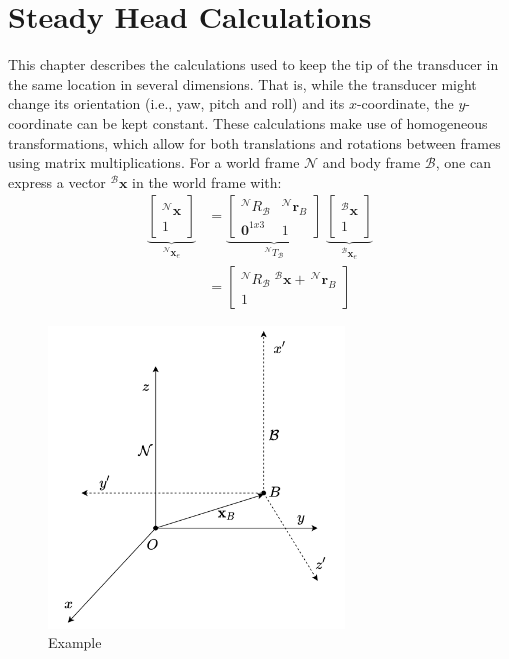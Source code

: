 \chapter{Steady Head Calculations}
\label{chap:SHC}
This chapter describes the calculations used to keep the tip of the transducer in the same location in several dimensions. That is, while the transducer might change its orientation (i.e., yaw, pitch and roll) and its $x$-coordinate, the $y$-coordinate can be kept constant. These calculations make use of homogeneous transformations, which allow for both translations and rotations between frames using matrix multiplications. For a world frame $\mathcal{N}$ and body frame $\mathcal{B}$, one can express a vector $^\mathcal{B}\mathbf{x}$ in the world frame with:
\begin{align}
    \underbrace{\left[\begin{array}{r} ^\mathcal{N}\mathbf{x}  \\ 1 \end{array}\right]}_{^\mathcal{N}\mathbf{x}_e}  &= \underbrace{\left[ \begin{array}{cc} ^\mathcal{N}R_\mathcal{B} &  ^\mathcal{N}\mathbf{r}_{B} \\ \mathbf{0}^{1x3} & 1 \end{array}  \right]}_{^\mathcal{N}T_\mathcal{B}} \; \underbrace{\left[\begin{array}{r} ^\mathcal{B}\mathbf{x}  \\ 1 \end{array}\right]}_{^\mathcal{B}\mathbf{x}_e} \label{eq: homTrans}\\
    &= \left[ \begin{array}{c}
         ^\mathcal{N}R_\mathcal{B}\; ^\mathcal{B}\mathbf{x} +\,  ^\mathcal{N}\mathbf{r}_{B} \\
         1
    \end{array} \right] \nonumber
\end{align}

\begin{figure}
    \centering
    \includegraphics[width=0.7\textwidth]{figures/SteadyHeadCalculations/SHC_transf.png}
    \caption{Example}
    \label{fig:my_label}
\end{figure}

% 
% 